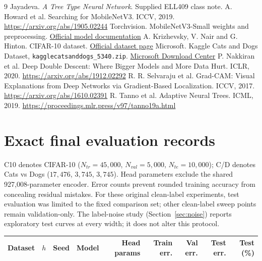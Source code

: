 \documentclass[11pt,a4paper]{article}
\begin{document}
\begingroup\footnotesize
\begin{thebibliography}{9}
\setlength{\itemsep}{0pt}\setlength{\parskip}{0pt}
 Jayadeva. \emph{A Tree Type Neural Network}. Supplied ELL409 class note.
 A. Howard et al. Searching for MobileNetV3. ICCV, 2019. \url{https://arxiv.org/abs/1905.02244}
 Torchvision. MobileNetV3-Small weights and preprocessing. \href{https://docs.pytorch.org/vision/stable/models/generated/torchvision.models.mobilenet_v3_small.html}{Official model documentation}
 A. Krizhevsky, V. Nair and G. Hinton. CIFAR-10 dataset. \href{https://www.cs.toronto.edu/~kriz/cifar.html}{Official dataset page}
 Microsoft. Kaggle Cats and Dogs Dataset, \texttt{kagglecatsanddogs\_5340.zip}. \href{https://www.microsoft.com/en-us/download/details.aspx?id=54765}{Microsoft Download Center}
 P. Nakkiran et al. Deep Double Descent: Where Bigger Models and More Data Hurt. ICLR, 2020. \url{https://arxiv.org/abs/1912.02292}
 R. R. Selvaraju et al. Grad-CAM: Visual Explanations from Deep Networks via Gradient-Based Localization. ICCV, 2017. \url{https://arxiv.org/abs/1610.02391}
 R. Tanno et al. Adaptive Neural Trees. ICML, 2019. \url{https://proceedings.mlr.press/v97/tanno19a.html}
\end{thebibliography}
\endgroup

\clearpage\appendix
\section{Exact final evaluation records}
\small
C10 denotes CIFAR-10 ($N_{tr}=45,000$, $N_{val}=5,000$, $N_{te}=10,000$); C/D denotes Cats vs Dogs ($17,476$, $3,745$, $3,745$). Head parameters exclude the shared 927,008-parameter encoder. Error counts prevent rounded training accuracy from concealing residual mistakes. For these original clean-label experiments, test evaluation was limited to the fixed comparison set; other clean-label sweep points remain validation-only. The label-noise study (Section~\ref{sec:noise}) reports exploratory test curves at every width; it does not alter this protocol.
\begin{longtable}{@{}lrrlrrrrr@{}}
\toprule Dataset & $h$ & Seed & Model & Head params & Train err. & Val err. & Test err. & Test (\%)\\\midrule\endhead

\end{longtable}
\end{document}

